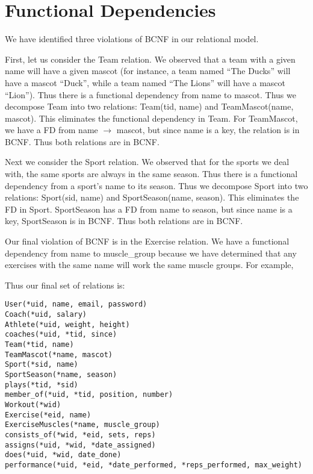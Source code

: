 \documentclass{article}
\begin{document}
\section{Functional Dependencies}

We have identified three violations of BCNF in our relational model. 

First, let us consider the Team relation.  We observed that a team with a given name 
will have a given mascot (for instance, a team named ``The Ducks'' will have a mascot ``Duck'',
while a team named ``The Lions'' will have a mascot ``Lion''). Thus there is a 
functional dependency from name to mascot. Thus we decompose Team into two relations:
Team(tid, name) and TeamMascot(name, mascot). This eliminates the functional dependency
in Team. For TeamMascot, we have a FD from name $\to$ mascot, but since name is a key,
the relation is in BCNF. Thus both relations are in BCNF.

Next we consider the Sport relation. We observed that for the sports we deal with, the same 
sports are always in the same season. Thus there is a functional dependency from a sport's
name to its season. Thus we decompose Sport into two relations: Sport(sid, name) and 
SportSeason(name, season). This eliminates the FD in Sport. SportSeason has a FD from
name to season, but since name is a key, SportSeason is in BCNF. Thus both relations 
are in BCNF. 

Our final violation of BCNF is in the Exercise relation.  We have a functional dependency from name to muscle_group because we have determined that any exercises with the same name will work the same muscle groups.  For example, 

Thus our final set of relations is:
    \begin{verbatim}
User(*uid, name, email, password)
Coach(*uid, salary)
Athlete(*uid, weight, height)
coaches(*uid, *tid, since)
Team(*tid, name)
TeamMascot(*name, mascot)
Sport(*sid, name)
SportSeason(*name, season)
plays(*tid, *sid)
member_of(*uid, *tid, position, number)
Workout(*wid)
Exercise(*eid, name)
ExerciseMuscles(*name, muscle_group)
consists_of(*wid, *eid, sets, reps)
assigns(*uid, *wid, *date_assigned)
does(*uid, *wid, date_done)
performance(*uid, *eid, *date_performed, *reps_performed, max_weight)
    \end{verbatim}
\end{document}
